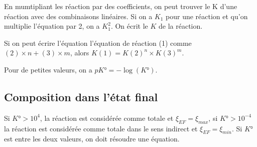 \documentclass[french]{yLectureNote}
\begin{document}
En mumtipliant les réaction par des coefficients, on peut trouver le K d'une réaction avec des combinaisons linéaires. Si on a \(K_1\) pour une réaction et qu'on multiplie l'équation par 2, on a $K_1^2$. On écrit le $K$ de la réaction.

Si on peut écrire l'équation l'équation de réaction (1) comme $(2)\times n + (3)\times m$, alors $K(1) = K(2)^n\times K(3)^m$.

Pour de petites valeurs, on a $pK° = -\log(K°)$.
\subsection{Composition dans l'état final}
Si $K° > 10^{4}$, la réaction est considérée comme totale et $\xi_{EF} = \xi_{max}$, si $K° > 10^{-4}$ la réaction est considérée comme totale dans le sens indirect et $\xi_{EF} = \xi_{min}$. Si $K°$ est entre les deux valeurs, on doit résoudre une équation.
\end{document}
